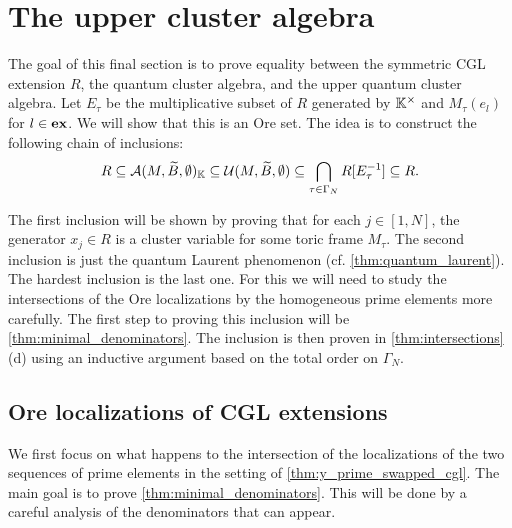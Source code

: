\section{The upper cluster algebra}\label{sec:upper_cluster_algebra}

The goal of this final section is to prove equality between the symmetric CGL extension
$R$, the quantum cluster algebra, and the upper quantum cluster algebra. Let $E_\tau$
be the multiplicative subset of $R$ generated by $\mathbb{K}^\times$ and $M_\tau(e_l)$ for $l
	\in \mathbf{ex}$. We will show that this is an Ore set. The idea is to construct the following
chain of inclusions:
\begin{equation*}
	R \subseteq \mathcal{A}(M, \widetilde{B}, \emptyset)_{\mathbb{K}} \subseteq \mathcal{U}(M, \widetilde{B}, \emptyset) \subseteq \bigcap_{\tau \in \Gamma_N} R[E_{\tau}^{-1}] \subseteq R.
\end{equation*}

The first inclusion will be shown by proving that for each $j \in [1, N]$, the
generator $x_j \in R$ is a cluster variable for some toric frame $M_\tau$. The second
inclusion is just the quantum Laurent phenomenon (cf. \cref{thm:quantum_laurent}). The
hardest inclusion is the last one. For this we will need to study the intersections of
the Ore localizations by the homogeneous prime elements more carefully. The first step
to proving this inclusion will be \cref{thm:minimal_denominators}. The inclusion is
then proven in \cref{thm:intersections} (d) using an inductive argument based on the
total order on $\Gamma_N$.

\subsection{Ore localizations of CGL extensions}\label{sec:ore_localizations}

We first focus on what happens to the intersection of the localizations of the two
sequences of prime elements in the setting of \cref{thm:y_prime_swapped_cgl}. The main
goal is to prove \cref{thm:minimal_denominators}. This will be done by a careful
analysis of the denominators that can appear.

